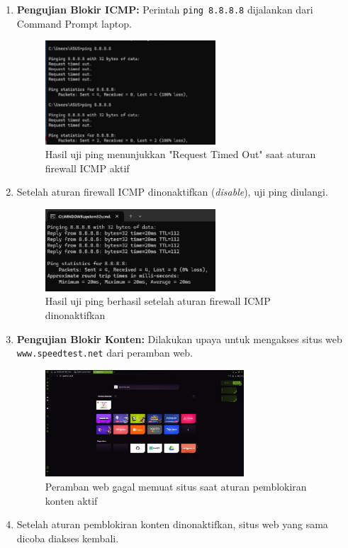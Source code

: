 \begin{enumerate}
    \item \textbf{Pengujian Blokir ICMP:} Perintah \texttt{ping 8.8.8.8} dijalankan dari Command Prompt laptop.
    \begin{figure}[H]
        \centering
        \includegraphics[width=0.6\textwidth]{img4/PingTestRTO.png}
        \caption{Hasil uji ping menunjukkan "Request Timed Out" saat aturan firewall ICMP aktif}
    \end{figure}
    \item Setelah aturan firewall ICMP dinonaktifkan (\textit{disable}), uji ping diulangi.
    \begin{figure}[H]
        \centering
        \includegraphics[width=0.6\textwidth]{img4/PingTestSuccess.png}
        \caption{Hasil uji ping berhasil setelah aturan firewall ICMP dinonaktifkan}
    \end{figure}
    
    \item \textbf{Pengujian Blokir Konten:} Dilakukan upaya untuk mengakses situs web \texttt{www.speedtest.net} dari peramban web.
    \begin{figure}[H]
        \centering
        \includegraphics[width=0.7\textwidth]{img4/SpeedTestBlocker.jpeg}
        \caption{Peramban web gagal memuat situs saat aturan pemblokiran konten aktif}
    \end{figure}
    \item Setelah aturan pemblokiran konten dinonaktifkan, situs web yang sama dicoba diakses kembali.
\end{enumerate}

